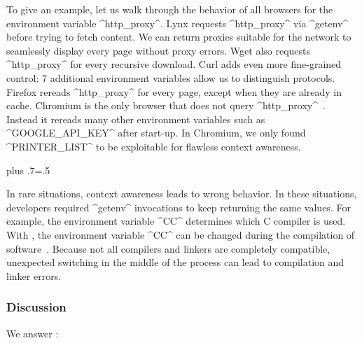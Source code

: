 To give an example, let us walk through the behavior of all browsers for the environment variable ^http_proxy^.
Lynx requests ^http_proxy^ via ^getenv^ before trying to fetch content.
We can return proxies suitable for the network to seamlessly display every page without proxy errors.
Wget also requests ^http_proxy^ for every recursive download.
Curl adds even more fine-grained control: 7 additional environment variables allow us to distinguish protocols.
Firefox rereads ^http_proxy^ for every page, except when they are already in cache.
Chromium is the only browser that does not query ^http_proxy^~\cite{raab2016unanticipated}.
Instead it rereads many other environment variables such as ^GOOGLE_API_KEY^ after start-up.
In Chromium, we only found ^PRINTER_LIST^ to be exploitable for flawless context awareness.%
{\parfillskip=0pt plus .7\textwidth \emergencystretch=.5\textwidth \par}


In rare situations, context awareness leads to wrong behavior.
In these situations, developers required ^getenv^ invocations to keep returning the same values.
For example, the environment variable ^CC^ determines which C compiler is used.
With \elektra{}, the environment variable ^CC^ can be changed during the compilation of software~\cite{raab2016improving}.
Because not all compilers and linkers are completely compatible, unexpected switching in the middle of the process can lead to compilation and linker errors.


\subsubsection{Discussion}

We answer :
\rqUnmodifiedWhich*

